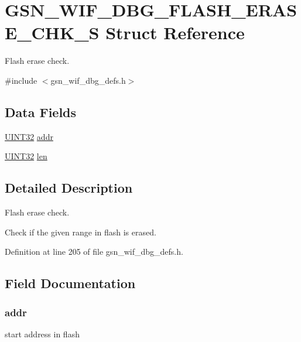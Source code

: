 \hypertarget{a00328}{
\section{GSN\_\-WIF\_\-DBG\_\-FLASH\_\-ERASE\_\-CHK\_\-S Struct Reference}
\label{a00328}
}


Flash erase check.  




{\ttfamily \#include $<$gsn\_\-wif\_\-dbg\_\-defs.h$>$}

\subsection*{Data Fields}
\begin{DoxyCompactItemize}
\item 
\hyperlink{a00660_gae1e6edbbc26d6fbc71a90190d0266018}{UINT32} \hyperlink{a00328_a211571ed47a0fee2d898236395234dab}{addr}
\item 
\hyperlink{a00660_gae1e6edbbc26d6fbc71a90190d0266018}{UINT32} \hyperlink{a00328_ab9abc6ede61238a05664f9c37e4412c3}{len}
\end{DoxyCompactItemize}


\subsection{Detailed Description}
Flash erase check. 

Check if the given range in flash is erased. 

Definition at line 205 of file gsn\_\-wif\_\-dbg\_\-defs.h.



\subsection{Field Documentation}
\hypertarget{a00328_a211571ed47a0fee2d898236395234dab}{
\subsubsection[{addr}]{ {\bf addr}}}
\label{a00328_a211571ed47a0fee2d898236395234dab}
start address in flash 

